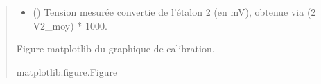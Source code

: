 \documentclass[letterpaper,10pt,english]{sphinxmanual}
\begin{document}
\begin{fulllineitems}
\begin{quote}
\begin{description}
\begin{itemize}
\item {} 
\sphinxAtStartPar
{} () \textendash{} Tension mesurée convertie de l’étalon 2 (en mV),
obtenue via (2 \sphinxhyphen{} V2\_moy) * 1000.

\end{itemize}

\sphinxAtStartPar
Figure matplotlib du graphique de calibration.

\sphinxAtStartPar
matplotlib.figure.Figure

\end{description}\end{quote}

\end{fulllineitems}



\renewcommand{\indexname}{Python Module Index}
\begin{sphinxtheindex}
\let\bigletter\sphinxstyleindexlettergroup
\bigletter{c}
\item\relax{}
\indexspace
\bigletter{m}
\item\relax{}
\indexspace
\bigletter{t}
\item\relax{}
\end{sphinxtheindex}

\renewcommand{\indexname}{Index}
\printindex
\end{document}
